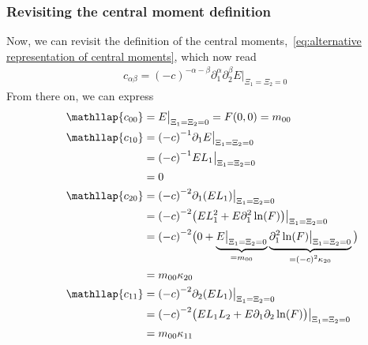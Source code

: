 \subsubsection{Revisiting the central moment definition}
\label{subs:Revisiting the central moment definition}
Now, we can revisit the definition of the central moments,~\eqref{eq:alternative representation of central moments}, which now read
\begin{equation}
  \begin{aligned}
    c_{\alpha\beta}= {(-c)}^{-\alpha-\beta} \partial_1^\alpha \partial_2^\beta E\bigr|_{\Xi_1=\Xi_2 = 0}
  \end{aligned}
\end{equation}
%
From there on, we can express
\begin{align*}
  \phantom{c_{00}}
  &\begin{aligned}
  \nonumber
    \mathllap{c_{00}} & = E\bigr|_{\Xi_1=\Xi_2 = 0} = F(0,0) = m_{00}
  \end{aligned}\\
  &\begin{aligned}
  \nonumber
    \mathllap{c_{10}} & = {(-c)}^{-1} \partial_1 E  \bigr|_{\Xi_1=\Xi_2 = 0} \\
    & = {(-c)}^{-1} EL_1  \bigr|_{\Xi_1=\Xi_2 = 0} \\
    & = 0
  \end{aligned}\\
  &\begin{aligned}
  \nonumber
    \mathllap{c_{20}} & = {(-c)}^{-2} \partial_1 (EL_1)  \bigr|_{\Xi_1=\Xi_2 = 0} \\
    & = {(-c)}^{-2} \big( EL_1^2 + E \partial_1^2\ln(F)\big)  \bigr|_{\Xi_1=\Xi_2 = 0} \\
    & = {(-c)}^{-2} \big( 0 + \underbrace{E \bigr|_{\Xi_1=\Xi_2 = 0}}_{=m_{00}}
    \underbrace{\partial_1^2\ln(F) \bigr|_{\Xi_1=\Xi_2 = 0}}_{={(-c)}^{2}\kappa_{20}} \big) \\
    & = m_{00}\kappa_{20}
  \end{aligned}\\
  &\begin{aligned}
  \nonumber
    \mathllap{c_{11}} & = {(-c)}^{-2} \partial_2 (EL_1) \bigr|_{\Xi_1=\Xi_2 = 0} \\
    & = {(-c)}^{-2} \big( E L_1 L_2 + E \partial_1\partial_2\ln(F) \big)  \bigr|_{\Xi_1=\Xi_2 = 0} \\
    & = m_{00}\kappa_{11}
  \end{aligned}\\

\end{align*}
